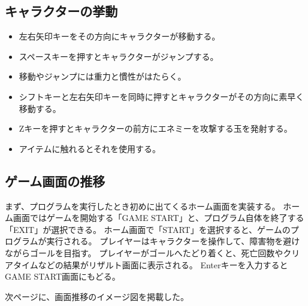 \documentclass[11pt,a4paper]{jsarticle}
\begin{document}
\subsection{キャラクターの挙動}
\begin{itemize}
\item 左右矢印キーをその方向にキャラクターが移動する。
\item スペースキーを押すとキャラクターがジャンプする。
\item 移動やジャンプには重力と慣性がはたらく。
\item シフトキーと左右矢印キーを同時に押すとキャラクターがその方向に素早く移動する。
\item Zキーを押すとキャラクターの前方にエネミーを攻撃する玉を発射する。
\item アイテムに触れるとそれを使用する。
\end{itemize}

\subsection{ゲーム画面の推移}
まず、プログラムを実行したとき初めに出てくるホーム画面を実装する。
ホーム画面ではゲームを開始する「GAME START」と、プログラム自体を終了する「EXIT」が選択できる。
ホーム画面で「START」を選択すると、ゲームのプログラムが実行される。
プレイヤーはキャラクターを操作して、障害物を避けながらゴールを目指す。
プレイヤーがゴールへたどり着くと、死亡回数やクリアタイムなどの結果がリザルト画面に表示される。
Enterキーを入力するとGAME START画面にもどる。

次ページに、画面推移のイメージ図を掲載した。
\end{document}
